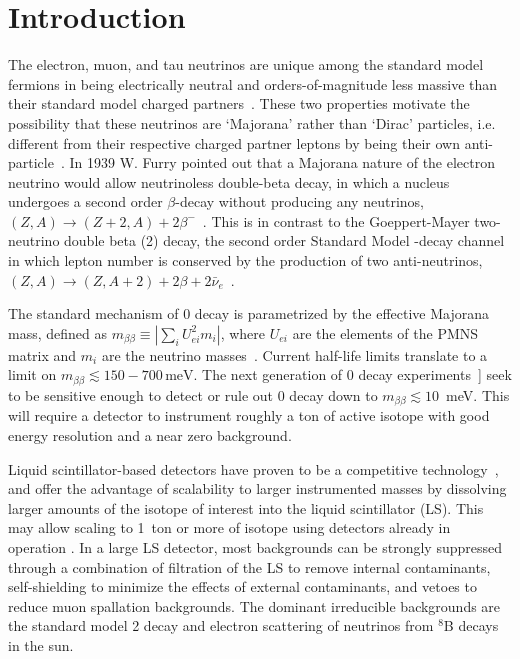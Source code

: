 \section{Introduction}

The electron, muon, and tau neutrinos are unique among the standard
model fermions in being electrically neutral and orders-of-magnitude
less massive than their standard model charged
partners~\cite{PDG_mass}.  These two properties motivate the
possibility that these neutrinos are `Majorana' rather than `Dirac'
particles, i.e. different from their respective charged partner
leptons by being their own
anti-particle~\cite{majorana,pdg_vogel_piepke}. In 1939 W. Furry
pointed out that a Majorana nature of the electron neutrino would
allow neutrinoless double-beta decay, in which a nucleus undergoes a
second order $\beta$-decay without producing any neutrinos,
$(Z,A)\rightarrow(Z+2,A)+2\beta^-$~\cite{Furry1939}.  This is in
contrast to the Goeppert-Mayer two-neutrino double beta (2{\nbb})
decay, the second order Standard Model \bmd-decay channel in which
lepton number is conserved by the production of two anti-neutrinos,
\mbox{$(Z,A)\rightarrow(Z,A+2)+2\beta+2\bar\nu_e$}~\cite{GoeppertMayer1935}.

The standard mechanism of 0{\nbb} decay is parametrized by the
effective Majorana mass, defined as
\mbox{$m_{\beta\beta}\equiv\left|\sum_i U^2_{ei}m_i\right|$}, where
$U_{ei}$ are the elements of the PMNS matrix and $m_i$ are the
neutrino masses~\cite{pdg_vogel_piepke}. Current half-life limits
translate to a limit on \mbox{$m_{\beta\beta}\lesssim
150-700\,\mathrm{meV}$}.  The next generation of 0{\nbb} decay
experiments~]\cite{pdg_vogel_piepke} seek to be sensitive enough to
detect or rule out 0{\nbb} decay down to \mbox{$m_{\beta\beta}\lesssim
10$~meV}. This will require a detector to instrument roughly a ton of
active isotope with good energy resolution and a near zero background.

Liquid scintillator-based detectors have proven to be a competitive
technology~\cite{KamLANDZen2013}, and offer the advantage of
scalability to larger instrumented masses by dissolving larger amounts
of the isotope of interest into the liquid scintillator (LS).  This
may allow scaling to 1~ton or more of isotope using detectors already
in operation \cite{Biller2013}.  In a large LS detector, most
backgrounds can be strongly suppressed through a combination of
filtration of the LS to remove internal contaminants, self-shielding
to minimize the effects of external contaminants, and vetoes to reduce
muon spallation backgrounds. The dominant irreducible backgrounds are
the standard model 2{\nbb} decay and electron scattering of 
neutrinos from $^8$B decays in the sun.

